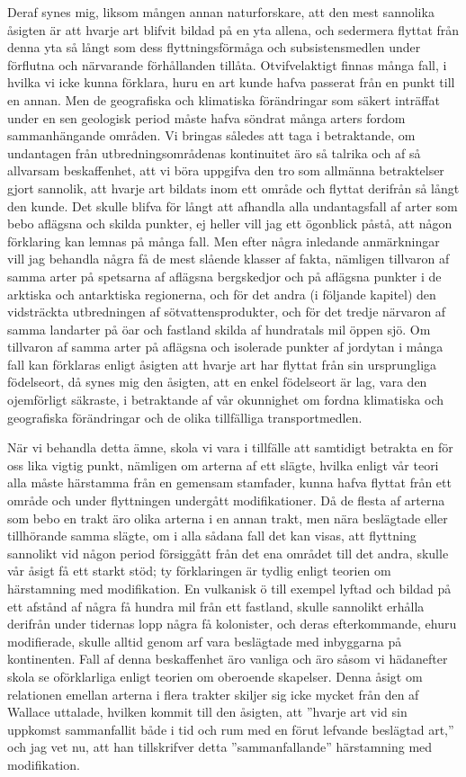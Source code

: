 Deraf synes mig, liksom mången annan naturforskare, att den mest sannolika åsigten är att hvarje art blifvit bildad på en yta allena, och sedermera flyttat från denna yta så långt som dess flyttningsförmåga och subsistensmedlen under förflutna och närvarande förhållanden tillåta. Otvifvelaktigt finnas många fall, i hvilka vi icke kunna förklara, huru en art kunde hafva passerat från en punkt till en annan. Men de geografiska och klimatiska förändringar som säkert inträffat under en sen geologisk period måste hafva söndrat många arters fordom sammanhängande områden. Vi bringas således att taga i betraktande, om undantagen från utbredningsområdenas kontinuitet äro så talrika och af så allvarsam beskaffenhet, att vi böra uppgifva den tro som allmänna betraktelser gjort sannolik, att hvarje art bildats inom ett område och flyttat derifrån så långt den kunde. Det skulle blifva för långt att afhandla alla undantagsfall af arter som bebo aflägsna och skilda punkter, ej heller vill jag ett ögonblick påstå, att någon förklaring kan lemnas på många fall. Men efter några inledande anmärkningar vill jag behandla några få de mest slående klasser af fakta, nämligen tillvaron af samma arter på spetsarna af aflägsna bergskedjor och på aflägsna punkter i de arktiska och antarktiska regionerna, och för det andra (i följande kapitel) den vidsträckta utbredningen af sötvattensprodukter, och för det tredje närvaron af samma landarter på öar och fastland skilda af hundratals mil öppen sjö. Om tillvaron af samma arter på aflägsna och isolerade punkter af jordytan i många fall kan förklaras enligt åsigten att hvarje art har flyttat från sin ursprungliga födelseort, då synes mig den åsigten, att en enkel födelseort är lag, vara den ojemförligt säkraste, i betraktande af vår okunnighet om fordna klimatiska och geografiska förändringar och de olika tillfälliga transportmedlen.

När vi behandla detta ämne, skola vi vara i tillfälle att samtidigt betrakta en för oss lika vigtig punkt, nämligen om arterna af ett slägte, hvilka enligt vår teori alla måste härstamma från en gemensam stamfader, kunna hafva flyttat från ett område och under flyttningen undergått modifikationer. Då de flesta af arterna som bebo en trakt äro olika arterna i en annan trakt, men nära beslägtade eller tillhörande samma slägte, om i alla sådana fall det kan visas, att flyttning sannolikt vid någon period försiggått från det ena området till det andra, skulle vår åsigt få ett starkt stöd; ty förklaringen är tydlig enligt teorien om härstamning med modifikation. En vulkanisk ö till exempel lyftad och bildad på ett afstånd af några få hundra mil från ett fastland, skulle sannolikt erhålla derifrån under tidernas lopp några få kolonister, och deras efterkommande, ehuru modifierade, skulle alltid genom arf vara beslägtade med inbyggarna på kontinenten. Fall af denna beskaffenhet äro vanliga och äro såsom vi hädanefter skola se oförklarliga enligt teorien om oberoende skapelser. Denna åsigt om relationen emellan arterna i flera trakter skiljer sig icke mycket från den af Wallace uttalade, hvilken kommit till den åsigten, att ”hvarje art vid sin uppkomst sammanfallit både i tid och rum med en förut lefvande beslägtad art,” och jag vet nu, att han tillskrifver detta ”sammanfallande” härstamning med modifikation.

